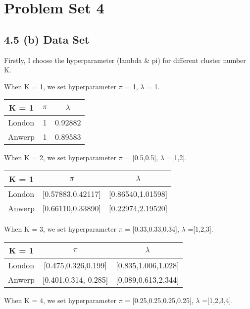 \documentclass[12pt]{myarticle}
\begin{document}
\section*{Problem Set 4}
\subsection*{4.5 (b) Data Set}
Firstly, I choose the hyperparameter (lambda \& pi) for different cluster number K.

When K = 1, we set hyperparameter $\pi$ = 1, $\lambda$ = 1.

\begin{table}[H]
    \centering
    \begin{tabular}{|c|c|c|}
    \hline
    K = 1       & $\pi$ & $\lambda$  \\ \hline
    London & 1  & 0.92882 \\ \hline
    Anwerp & 1  & 0.89583 \\ \hline
    \end{tabular}
\end{table}

When K = 2, we set hyperparameter $\pi$ = [0.5,0.5], $\lambda$ =[1,2].

\begin{table}[H]
    \centering
    \begin{tabular}{|c|c|c|}
    \hline
    K = 1       & $\pi$  & $\lambda$  \\ \hline
    London & [0.57883,0.42117]  & [0.86540,1.01598] \\ \hline
    Anwerp & [0.66110,0.33890]  & [0.22974,2.19520] \\ \hline
    \end{tabular}
\end{table}

When K = 3, we set hyperparameter $\pi$ = [0.33,0.33,0.34], $\lambda$ =[1,2,3].

\begin{table}[H]
    \centering
    \begin{tabular}{|c|c|c|}
    \hline
    K = 1       & $\pi$  & $\lambda$  \\ \hline
    London & [0.475,0.326,0.199]  & [0.835,1.006,1.028] \\ \hline
    Anwerp & [0.401,0.314, 0.285]  & [0.089,0.613,2.344] \\ \hline
    \end{tabular}
\end{table}

When K = 4, we set hyperparameter $\pi$ = [0.25,0.25,0.25,0.25], $\lambda$ =[1,2,3,4].
\end{document}
